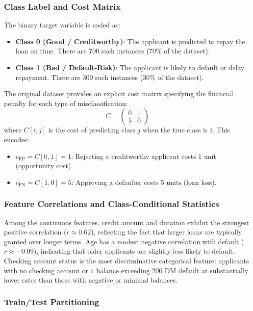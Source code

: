 \documentclass[12pt,a4paper]{article}
\begin{document}
\subsubsection{Class Label and Cost Matrix}

The binary target variable is coded as:
\begin{itemize}
    \item \textbf{Class 0 (Good / Creditworthy)}: The applicant is predicted to repay the loan on time. There are 700 such instances (70\% of the dataset).
    \item \textbf{Class 1 (Bad / Default-Risk)}: The applicant is likely to default or delay repayment. There are 300 such instances (30\% of the dataset).
\end{itemize}

The original dataset provides an explicit cost matrix specifying the financial penalty for each type of misclassification:
\[
C = \begin{pmatrix} 0 & 1 \\ 5 & 0 \end{pmatrix}
\]
where $C[i,j]$ is the cost of predicting class $j$ when the true class is $i$. This encodes:
\begin{itemize}
    \item $c_\text{FP} = C[0,1] = 1$: Rejecting a creditworthy applicant costs 1 unit (opportunity cost).
    \item $c_\text{FN} = C[1,0] = 5$: Approving a defaulter costs 5 units (loan loss).
\end{itemize}

\subsubsection{Feature Correlations and Class-Conditional Statistics}

Among the continuous features, credit amount and duration exhibit the strongest positive correlation ($r \approx 0.62$), reflecting the fact that larger loans are typically granted over longer terms. Age has a modest negative correlation with default ($r \approx -0.09$), indicating that older applicants are slightly less likely to default. Checking account status is the most discriminative categorical feature: applicants with no checking account or a balance exceeding 200 DM default at substantially lower rates than those with negative or minimal balances.

\subsubsection{Train/Test Partitioning}
\end{document}

